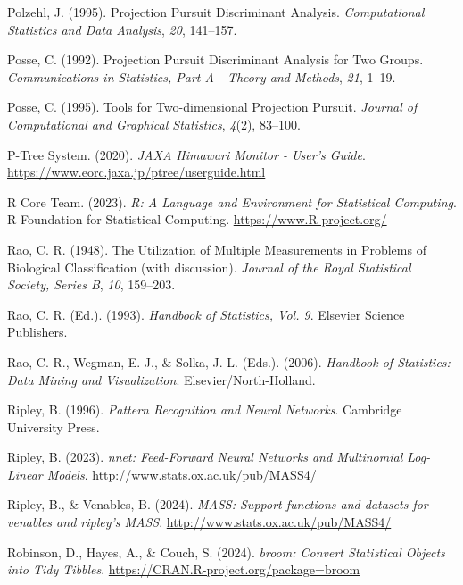 \documentclass[
  letterpaper,
]{krantz}
\newlength{\cslhangindent}
\newenvironment{CSLReferences}[2] %
 {\begin{list}{}{%
  \setlength{\itemindent}{0pt}
  \setlength{\leftmargin}{0pt}
  \setlength{\parsep}{0pt}
  \ifodd #1
   \setlength{\leftmargin}{\cslhangindent}
   \setlength{\itemindent}{-1\cslhangindent}
  \fi
  \setlength{\itemsep}{#2\baselineskip}}}
 {\end{list}}
\begin{document}
\begin{CSLReferences}{1}{0}
Polzehl, J. (1995). Projection {P}ursuit {D}iscriminant {A}nalysis.
\emph{Computational Statistics and Data Analysis}, \emph{20}, 141--157.

Posse, C. (1992). Projection {P}ursuit {D}iscriminant {A}nalysis for
{T}wo {G}roups. \emph{Communications in Statistics, Part A - Theory and
Methods}, \emph{21}, 1--19.

Posse, C. (1995). Tools for {T}wo-dimensional {P}rojection {P}ursuit.
\emph{Journal of Computational and Graphical Statistics}, \emph{4}(2),
83--100.

P-Tree System. (2020). \emph{{JAXA Himawari Monitor - User's Guide}}.
\url{https://www.eorc.jaxa.jp/ptree/userguide.html}

R Core Team. (2023). \emph{R: A {L}anguage and {E}nvironment for
{S}tatistical {C}omputing}. R Foundation for Statistical Computing.
\url{https://www.R-project.org/}

Rao, C. R. (1948). The {U}tilization of {M}ultiple {M}easurements in
{P}roblems of {B}iological {C}lassification (with discussion).
\emph{Journal of the Royal Statistical Society, Series B}, \emph{10},
159--203.

Rao, C. R. (Ed.). (1993). \emph{{H}andbook of {S}tatistics, {V}ol. 9}.
Elsevier Science Publishers.

Rao, C. R., Wegman, E. J., \& Solka, J. L. (Eds.). (2006).
\emph{Handbook of {S}tatistics: {D}ata {M}ining and {V}isualization}.
Elsevier/North-Holland.

Ripley, B. (1996). \emph{Pattern {R}ecognition and {N}eural {N}etworks}.
Cambridge University Press.

Ripley, B. (2023). \emph{{nnet}: {F}eed-{F}orward {N}eural {N}etworks
and {M}ultinomial {L}og-{L}inear {M}odels}.
\url{http://www.stats.ox.ac.uk/pub/MASS4/}

Ripley, B., \& Venables, B. (2024). \emph{MASS: Support functions and
datasets for venables and ripley's MASS}.
\url{http://www.stats.ox.ac.uk/pub/MASS4/}

Robinson, D., Hayes, A., \& Couch, S. (2024). \emph{{broom}: {C}onvert
{S}tatistical {O}bjects into {T}idy {T}ibbles}.
\url{https://CRAN.R-project.org/package=broom}


\end{CSLReferences}
\end{document}
